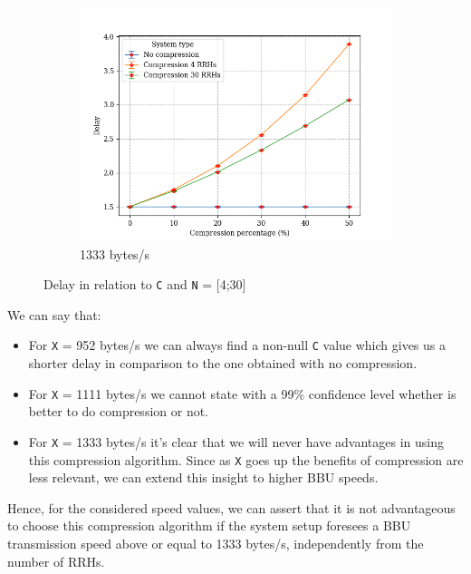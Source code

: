 \documentclass[11pt,a4paper,oneside, openright]{article}
\begin{document}
\begin{figure}[h]
	\begin{subfigure}{.5\textwidth}
		\centering
		\includegraphics[width=\linewidth]{images/comp-s-1333}
		\caption{1333 bytes/s}
		\label{fig:comp-s-1333}
	\end{subfigure}
	\caption{Delay in relation to \texttt{C} and \texttt{N} = [4;30]}
	\label{fig:compress-s}
\end{figure}
We can say that:
\begin{itemize}
	\item For \texttt{X} = 952 bytes/s we can always find a non-null \texttt{C} value which gives us a shorter delay in comparison to the one obtained with no compression.
	\item For \texttt{X} = 1111 bytes/s we cannot state with a 99\% confidence level whether is better to do compression or not.
	\item For \texttt{X} = 1333 bytes/s it's clear that we will never have advantages in using this compression algorithm. Since as \texttt{X} goes up the benefits of compression are less relevant, we can extend this insight to higher BBU speeds. 
\end{itemize}
Hence, for the considered speed values, we can assert that it is not advantageous to choose this compression algorithm if the system setup foresees a BBU transmission speed above or equal to 1333 bytes/s, independently from the number of RRHs.
\newpage
\end{document}
